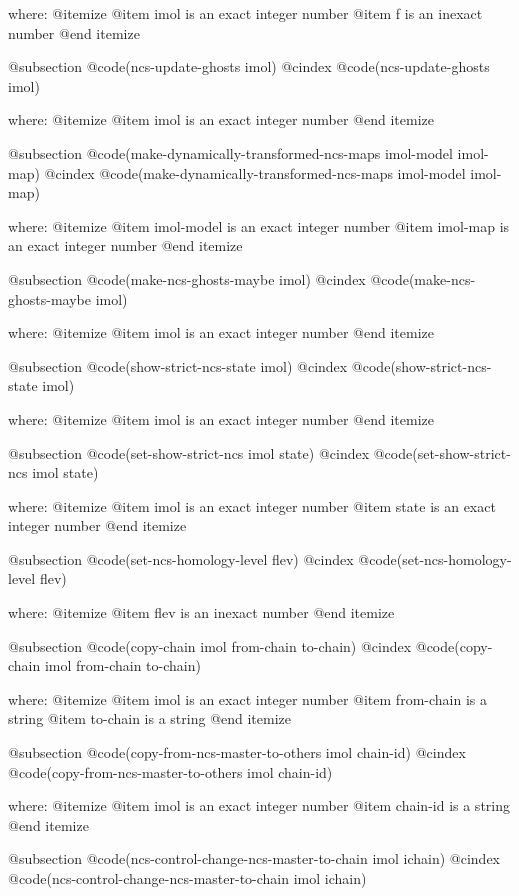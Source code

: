 where: 
 @itemize 
     @item imol is an exact integer number
     @item f is an inexact number
 @end itemize


@subsection @code{(ncs-update-ghosts imol)}
@cindex @code{(ncs-update-ghosts imol)}
 
where: 
 @itemize 
     @item imol is an exact integer number
 @end itemize


@subsection @code{(make-dynamically-transformed-ncs-maps imol-model imol-map)}
@cindex @code{(make-dynamically-transformed-ncs-maps imol-model imol-map)}
 
where: 
 @itemize 
     @item imol-model is an exact integer number
     @item imol-map is an exact integer number
 @end itemize


@subsection @code{(make-ncs-ghosts-maybe imol)}
@cindex @code{(make-ncs-ghosts-maybe imol)}
 
where: 
 @itemize 
     @item imol is an exact integer number
 @end itemize


@subsection @code{(show-strict-ncs-state imol)}
@cindex @code{(show-strict-ncs-state imol)}
 
where: 
 @itemize 
     @item imol is an exact integer number
 @end itemize


@subsection @code{(set-show-strict-ncs imol state)}
@cindex @code{(set-show-strict-ncs imol state)}
 
where: 
 @itemize 
     @item imol is an exact integer number
     @item state is an exact integer number
 @end itemize


@subsection @code{(set-ncs-homology-level flev)}
@cindex @code{(set-ncs-homology-level flev)}
 
where: 
 @itemize 
     @item flev is an inexact number
 @end itemize


@subsection @code{(copy-chain imol from-chain to-chain)}
@cindex @code{(copy-chain imol from-chain to-chain)}
 
where: 
 @itemize 
     @item imol is an exact integer number
     @item from-chain is a string
     @item to-chain is a string
 @end itemize


@subsection @code{(copy-from-ncs-master-to-others imol chain-id)}
@cindex @code{(copy-from-ncs-master-to-others imol chain-id)}
 
where: 
 @itemize 
     @item imol is an exact integer number
     @item chain-id is a string
 @end itemize


@subsection @code{(ncs-control-change-ncs-master-to-chain imol ichain)}
@cindex @code{(ncs-control-change-ncs-master-to-chain imol ichain)}
 
